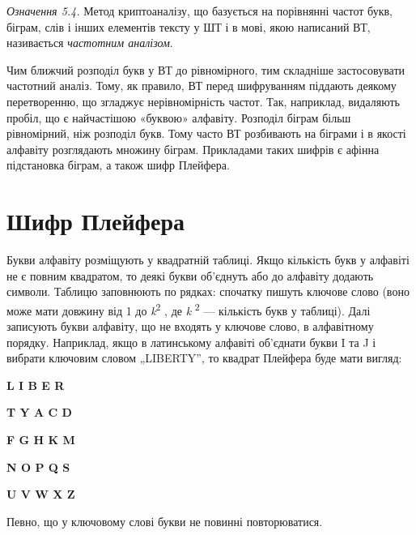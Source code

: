 {\textit{Означення 5.4.}\textit{ }Метод криптоаналізу, що базується на порівнянні
частот букв, біграм, слів і інших елементів тексту у ШТ і в мові, якою
написаний ВТ, називається \textit{частотним аналізом}.

Чим ближчий розподіл букв у ВТ до рівномірного, тим складніше застосовувати
частотний аналіз. Тому, як правило, ВТ перед шифруванням піддають деякому
перетворенню, що згладжує нерівномірність частот. Так, наприклад, видаляють
пробіл, що є найчастішою «буквою» алфавіту. Розподіл біграм більш рівномірний,
ніж розподіл букв. Тому часто ВТ розбивають на біграми і в якості алфавіту
розглядають множину біграм. Прикладами таких шифрів є афінна підстановка
біграм, а також шифр Плейфера.


\bigskip

\section{Шифр Плейфера}


\bigskip


\bigskip

Букви алфавіту розміщують у квадратній таблиці. Якщо кількість букв у алфавіті
не є повним квадратом, то деякі букви об’єднуть або до алфавіту додають
символи. Таблицю заповнюють по рядках: спочатку пишуть ключове слово (воно може
мати довжину від 1 до \textit{k}\textsuperscript{2} , де
\textit{k}\textsuperscript{ 2} --- кількість букв у таблиці). Далі записують
букви алфавіту, що не входять у ключове слово, в алфавітному порядку.
Наприклад, якщо в латинському алфавіті об’єднати букви I та J і вибрати
ключовим словом „LIBERTY”, то квадрат Плейфера буде мати вигляд:


\bigskip

{\centering\bfseries
L  I  B  E  R
\par}

{\centering\bfseries
T  Y  A  C  D
\par}

{\centering\bfseries
F  G  H  K  M
\par}

{\centering\bfseries
N  O  P  Q  S
\par}

{\centering\bfseries
U  V  W  X  Z
\par}


\bigskip


\bigskip

Певно, що у ключовому слові букви не повинні повторюватися.

}
